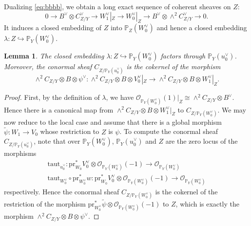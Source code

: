 \documentclass{amsart}
\numberwithin{equation}{section}
\newcommand\mc{\mathcal}
\newcommand\mb{\mathbb}
\newcommand{\pr}{\mathrm{pr}}
\newcommand{\taut}{\mathrm{taut}}
\newtheorem{lemma}[theorem]{Lemma}
\theoremstyle{definition}
\theoremstyle{remark}
\begin{document}
Dualizing \cref{eq:bbbb}, we obtain a long exact sequence of coherent sheaves on $Z$:
\begin{equation*}
  0 \to B^{\vee}\otimes C_{Z/Y}^{\vee} \to W_1^{\vee}|_{Z} \to W_0^{\vee}|_{Z} \to B^{\vee}\otimes \wedge^2 C_{Z/Y}^{\vee} \to 0.
\end{equation*}
It induces a closed embedding of $Z$ into $\mb{P}_Z(W_0^{\vee})$ and hence a closed embedding $\lambda:Z\hookrightarrow\mb{P}_Y(W_0^{\vee})$. 

\begin{lemma}
  \label{lemmaB}
  The closed embedding $\lambda:Z\hookrightarrow \mb{P}_Y(W_0^\vee)$ factors through $\mb{P}_Y(u^{\vee}_0)$. Moreover, the conormal sheaf $C_{Z/\mb{P}_Y(u_0^{\vee})}$ is the cokernel of the morphism 
  $$\wedge^2C_{Z/Y}\otimes B\otimes \psi^{\vee}: \wedge^2C_{Z/Y}\otimes B\otimes V_0^{\vee}|_Z\to \wedge^2C_{Z/Y}\otimes B\otimes W_1^{\vee}|_Z.$$
\end{lemma}
\begin{proof}
First, by the definition of $\lambda$, we have $\mc{O}_{\mb{P}_Y(W_0^\vee)}(1)|_Z\cong \wedge^2 C_{Z/Y}\otimes B^{\vee}$. Hence there is a canonical map from $\wedge^2C_{Z/Y}\otimes B\otimes W_1^{\vee}|_Z$ to $C_{Z/\mb{P}_Y(W_0^\vee)}$. We may now reduce to the local case and assume that there is a global morphism $\widetilde{\psi}:W_1\to V_0$ whose restriction to $Z$ is $\psi$. 
To compute the conormal sheaf $C_{Z/\mb{P}_Y(u_0^{\vee})}$, note that over $\mb{P}_Y(W_0^{\vee})$, $\mb{P}_Y(u_0^{\vee})$ and 
$Z$ are the zero locus of the morphisms
\begin{align*}
   \taut_{u_0^{\vee}}:\pr_{W_0}^{*}V_0^{\vee}\otimes \mc{O}_{\mb{P}_Y(W_0^{\vee})}(-1)\to \mc{O}_{\mb{P}_Y(W_0^{\vee})}  \\ \taut_{W_0^{\vee}}\circ \pr_{W_0^{\vee}}^*w:\pr_{W_0}^{*}V_0^{\vee}\otimes \mc{O}_{\mb{P}_Y(W_0^{\vee})}(-1)\to \mc{O}_{\mb{P}_Y(W_0^{\vee})}
\end{align*}
respectively. Hence the conormal sheaf $C_{Z/\mb{P}_Y(W_0^{\vee})}$ is the cokernel of the restriction of the morphism $\pr_{W_0^{\vee}}^*\widetilde{\psi}\otimes \mc{O}_{\mb{P}_Y(W_0^{\vee})}(-1)$ to $Z$, which is exactly the morphism $\wedge^2C_{Z/Y}\otimes B\otimes \psi^{\vee}$.
\end{proof}
\end{document}
